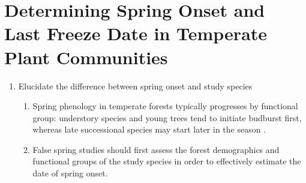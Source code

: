\documentclass{article}\usepackage[]{graphicx}\usepackage[]{color}
\begin{document}
\section*{Determining Spring Onset and Last Freeze Date in Temperate Plant Communities}
\begin{enumerate}
\item Elucidate the difference between spring onset and study species 
\begin{enumerate}
\item Spring phenology in temperate forests typically progresses by functional group: understory species and young trees tend to initiate budburst first, whereas late successional species may start later in the season \citep{Richardson2009, Xin2016}.
\item False spring studies should first assess the forest demographics and functional groups of the study species in order to effectively estimate the date of spring onset.

\end{enumerate}


\end{enumerate}
\end{document}
